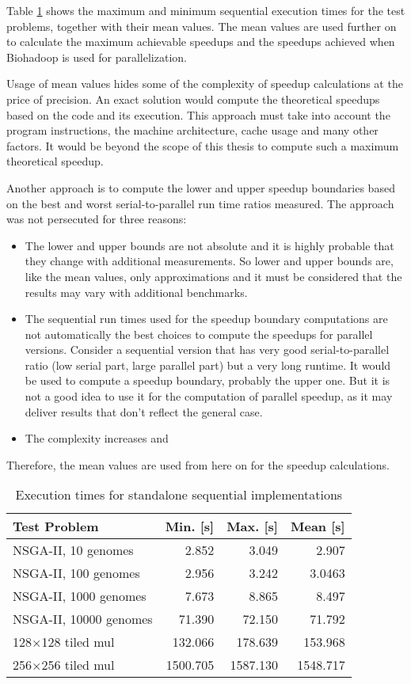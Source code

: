 Table \ref{table:sequential-runtimes} shows the maximum and minimum sequential execution times for the test problems, together with their mean values. The mean values are used further on to calculate the maximum achievable speedups and the speedups achieved when Biohadoop is used for parallelization.

Usage of mean values hides some of the complexity of speedup calculations at the price of precision. An exact solution would compute the theoretical speedups based on the code and its execution. This approach must take into account the program instructions, the machine architecture, cache usage and many other factors. It would be beyond the scope of this thesis to compute such a maximum theoretical speedup.

Another approach is to compute the lower and upper speedup boundaries based on the best and worst serial-to-parallel run time ratios measured. The approach was not persecuted for three reasons:
\begin{itemize}
  \item The lower and upper bounds are not absolute and it is highly probable that they change with additional measurements. So lower and upper bounds are, like the mean values, only approximations and it must be considered that the results may vary with additional benchmarks.
  \item The sequential run times used for the speedup boundary computations are not automatically the best choices to compute the speedups for parallel versions. Consider a sequential version that has very good serial-to-parallel ratio (low serial part, large parallel part) but a very long runtime. It would be used to compute a speedup boundary, probably the upper one. But it is not a good idea to use it for the computation of parallel speedup, as it may deliver results that don't reflect the general case.
  \item The complexity increases and 
\end{itemize}

Therefore, the mean values are used from here on for the speedup calculations.

\begin{table}
  \centering
  \caption{Execution times for standalone sequential implementations}
  \begin{tabular}{lrrr}\toprule[2pt]
    Test Problem &  Min. [s] & Max. [s] & Mean [s] \\ \midrule
    NSGA-II, 10 genomes & 2.852 & 3.049 & 2.907 \\
    NSGA-II, 100 genomes & 2.956 & 3.242 & 3.0463 \\
    NSGA-II, 1000 genomes & 7.673 & 8.865 & 8.497 \\
    NSGA-II, 10000 genomes & 71.390 & 72.150 & 71.792 \\
    128$\times$128 tiled mul & 132.066 & 178.639 & 153.968 \\
    256$\times$256 tiled mul & 1500.705 & 1587.130 & 1548.717 \\ \bottomrule[2pt]
  \end{tabular}
  \label{table:sequential-runtimes}
\end{table}


